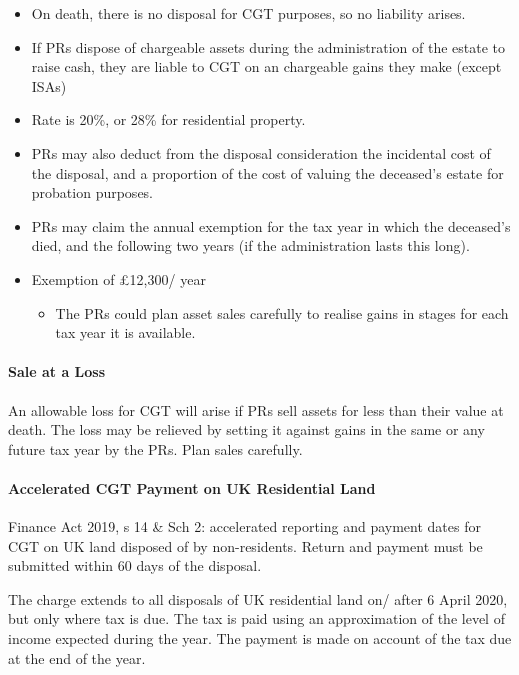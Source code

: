 \documentclass[
]{article}
\providecommand{\tightlist}{%
  \setlength{\itemsep}{0pt}\setlength{\parskip}{0pt}}
\begin{document}
\begin{itemize}
\tightlist
\item
  On death, there is no disposal for CGT purposes, so no liability
  arises.
\item
  If PRs dispose of chargeable assets during the administration of the
  estate to raise cash, they are liable to CGT on an chargeable gains
  they make (except ISAs)
\item
  Rate is 20\%, or 28\% for residential property.
\item
  PRs may also deduct from the disposal consideration the incidental
  cost of the disposal, and a proportion of the cost of valuing the
  deceased's estate for probation purposes.
\item
  PRs may claim the annual exemption for the tax year in which the
  deceased's died, and the following two years (if the administration
  lasts this long).
\item
  Exemption of £12,300/ year

  \begin{itemize}
  \tightlist
  \item
    The PRs could plan asset sales carefully to realise gains in stages
    for each tax year it is available.
  \end{itemize}
\end{itemize}

\hypertarget{sale-at-a-loss}{%
\paragraph{Sale at a Loss}\label{sale-at-a-loss}}

An allowable loss for CGT will arise if PRs sell assets for less than
their value at death. The loss may be relieved by setting it against
gains in the same or any future tax year by the PRs. Plan sales
carefully.

\hypertarget{accelerated-cgt-payment-on-uk-residential-land}{%
\paragraph{Accelerated CGT Payment on UK Residential
Land}\label{accelerated-cgt-payment-on-uk-residential-land}}

Finance Act 2019, s 14 \& Sch 2: accelerated reporting and payment dates
for CGT on UK land disposed of by non-residents. Return and payment must
be submitted within 60 days of the disposal.

The charge extends to all disposals of UK residential land on/ after 6
April 2020, but only where tax is due. The tax is paid using an
approximation of the level of income expected during the year. The
payment is made on account of the tax due at the end of the year.
\end{document}
